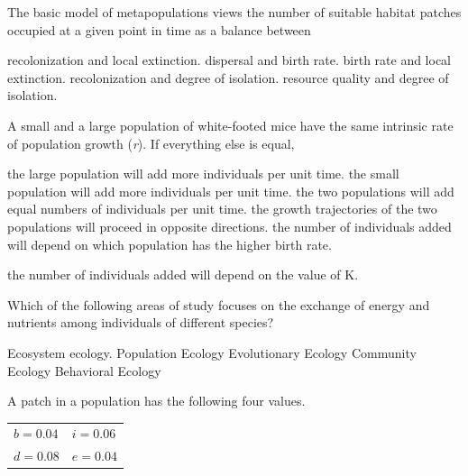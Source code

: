 \question
The basic model of metapopulations views the number of suitable habitat patches occupied at a given point in time as a balance between

\begin{choices}
\correctchoice recolonization and local extinction. %
\choice dispersal and birth rate. %
\choice birth rate and local extinction. %
\choice recolonization and degree of isolation. %
\choice resource quality and degree of isolation. %
\end{choices}



\question
A small and a large population of white-footed mice have the same intrinsic rate of population growth (\textit{r}).  If everything else is equal, 

\begin{choices}
\correctchoice the large population will add more individuals per unit time.  %
\choice the small population will add more individuals per unit time. %
\choice the two populations will add equal numbers of individuals per unit time.%
\choice the growth trajectories of the two populations will proceed in opposite directions. %
\choice the number of individuals added will depend on which population has the higher birth rate. %
\end{choices}

\choice the number of individuals added will depend on the value of K. %


\question
Which of the following areas of study focuses on the exchange of energy and nutrients among individuals of different species?

\begin{choices}
\correctchoice Ecosystem ecology. %
\choice Population Ecology %
\choice Evolutionary Ecology %
\choice Community Ecology %
\choice Behavioral Ecology %
\end{choices}


\question
A patch in a population has the following four values. 

\qquad\begin{tabular}{@{}ll@{}}
$b = 0.04$ & $i = 0.06$\\
$d = 0.08$ & $e = 0.04$\\
\end{tabular}

